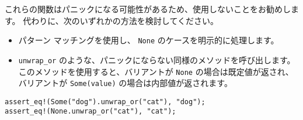 これらの関数はパニックになる可能性があるため、使用しないことをお勧めします。 代わりに、次のいずれかの方法を検討してください。

\begin{itemize}
\item パターン マッチングを使用し、 \texttt{None} のケースを明示的に処理します。
\item \texttt{unwrap\_or} のような、パニックにならない同様のメソッドを呼び出します。このメソッドを使用すると、バリアントが \texttt{None} の場合は既定値が返され、バリアントが \texttt{Some(value)} の場合は内部値が返されます。    
\end{itemize}

\begin{lstlisting}[numbers=none]
assert_eq!(Some("dog").unwrap_or("cat"), "dog");
assert_eq!(None.unwrap_or("cat"), "cat");
\end{lstlisting}






